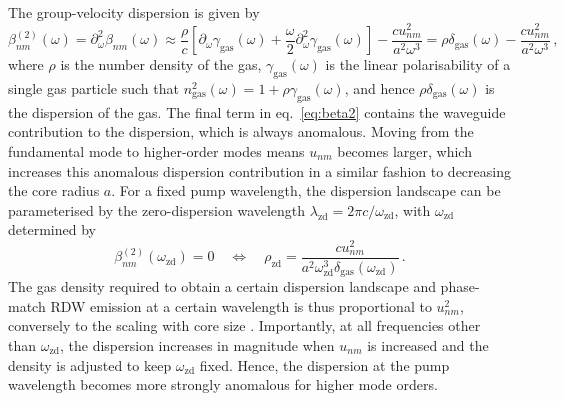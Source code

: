 \documentclass[amsmath, preprint, floatfix]{revtex4-2}
\begin{document}
The group-velocity dispersion is given by
\begin{equation}
    \beta^{(2)}_{nm}(\omega) = \partial^2_\omega \beta_{nm}(\omega) \approx \frac{\rho}{c}\left[\partial_\omega\gamma_\mathrm{gas}(\omega) + \frac{\omega}{2}\partial_\omega^2\gamma_\mathrm{gas}(\omega)\right] - \frac{c u_{nm}^2}{a^2 \omega^3} = \rho\delta_\mathrm{gas}(\omega) - \frac{c u_{nm}^2}{a^2 \omega^3}\,,
    \label{eq:beta2}
\end{equation}
where $\rho$ is the number density of the gas, $\gamma_\mathrm{gas}(\omega)$ is the linear polarisability of a single gas particle such that $n_\mathrm{gas}^2(\omega) = 1+\rho\gamma_\mathrm{gas}(\omega)$, and hence $\rho\delta_\mathrm{gas}(\omega)$ is the dispersion of the gas. The final term in eq.~\ref{eq:beta2} contains the waveguide contribution to the dispersion, which is always anomalous. Moving from the fundamental mode to higher-order modes means $u_{nm}$ becomes larger, which increases this anomalous dispersion contribution in a similar fashion to decreasing the core radius $a$. For a fixed pump wavelength, the dispersion landscape can be parameterised by the zero-dispersion wavelength $\lambda_\mathrm{zd} = 2\pi c/\omega_\mathrm{zd}$, with $\omega_\mathrm{zd}$ determined by
\begin{equation}
    \beta^{(2)}_{nm}(\omega_\mathrm{zd}) = 0 \quad \iff \quad \rho_\mathrm{zd} = \frac{c u_{nm}^2}{a^2 \omega_\mathrm{zd}^3 \delta_\mathrm{gas}(\omega_\mathrm{zd})}\,.
\end{equation}
The gas density required to obtain a certain dispersion landscape and phase-match RDW emission at a certain wavelength is thus proportional to $u_{nm}^2$, conversely to the scaling with core size \cite{travers_high-energy_2019,heyl_scale-invariant_2016}. Importantly, at all frequencies other than $\omega_\mathrm{zd}$, the dispersion increases in magnitude when $u_{nm}$ is increased and the density is adjusted to keep $\omega_\mathrm{zd}$ fixed. Hence, the dispersion at the pump wavelength becomes more strongly anomalous for higher mode orders.
\end{document}
